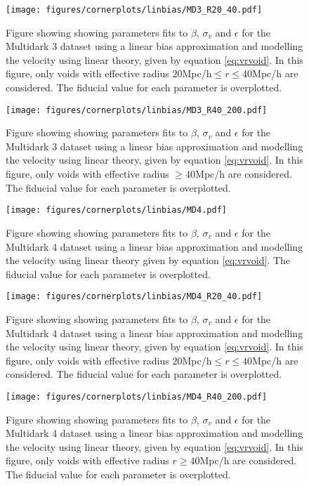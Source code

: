\begin{figure}[H]
    \texttt{[image: figures/cornerplots/linbias/MD3\_R20\_40.pdf]}
    \caption{Figure showing showing parameters fits to $\beta$, $\sigma_v$ and $\epsilon$ for the Multidark 3 dataset using a linear bias approximation and modelling the velocity using linear theory, given by equation \ref{eq:vrvoid}. In this figure, only voids with effective radius $20$Mpc/h$\leq r \leq 40$Mpc/h are considered. The fiducial value for each parameter is overplotted.}
    \label{fig:linbiasMD3R2040}
\end{figure}

\begin{figure}[H]
    \texttt{[image: figures/cornerplots/linbias/MD3\_R40\_200.pdf]}
    \caption{Figure showing showing parameters fits to $\beta$, $\sigma_v$ and $\epsilon$ for the Multidark 3 dataset using a linear bias approximation and modelling the velocity using linear theory, given by equation \ref{eq:vrvoid}. In this figure, only voids with effective radius $\geq 40$Mpc/h are considered. The fiducial value for each parameter is overplotted.}
    \label{fig:linbiasMD3R40}
\end{figure}

\begin{figure}[H]
    \texttt{[image: figures/cornerplots/linbias/MD4.pdf]}
    \caption{Figure showing showing parameters fits to $\beta$, $\sigma_v$ and $\epsilon$ for the Multidark 4 dataset using a linear bias approximation and  modelling the velocity using linear theory given by equation \ref{eq:vrvoid}.
    The fiducial value for each parameter is overplotted.}
    \label{fig:linbiasMD4}
\end{figure}

\begin{figure}[H]
    \texttt{[image: figures/cornerplots/linbias/MD4\_R20\_40.pdf]}
    \caption{Figure showing showing parameters fits to $\beta$, $\sigma_v$ and $\epsilon$ for the Multidark 4 dataset using a linear bias approximation and modelling the velocity using linear theory, given by equation \ref{eq:vrvoid}. In this figure, only voids with effective radius $20$Mpc/h$\leq r \leq 40$Mpc/h are considered. The fiducial value for each parameter is overplotted.}
    \label{fig:linbiasMD4R2040}
\end{figure}

\begin{figure}[H]
    \texttt{[image: figures/cornerplots/linbias/MD4\_R40\_200.pdf]}
    \caption{Figure showing showing parameters fits to $\beta$, $\sigma_v$ and $\epsilon$ for the Multidark 4 dataset using a linear bias approximation and modelling the velocity using linear theory, given by equation \ref{eq:vrvoid}. In this figure, only voids with effective radius $r\geq 40$Mpc/h are considered. The fiducial value for each parameter is overplotted.}
    \label{fig:linbiasMD4R40}
\end{figure}
